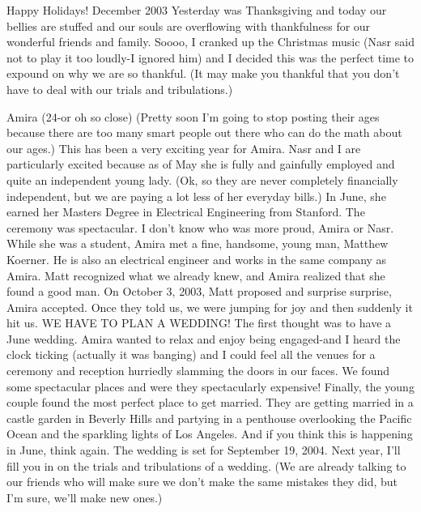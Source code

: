 

Happy Holidays!                                                  \hfill December 2003
\vspace{.5in}
Yesterday was Thanksgiving and today our bellies are stuffed and our souls are overflowing with thankfulness for our wonderful friends and
family.  Soooo, I cranked up the Christmas music (Nasr said not to play it too loudly-I ignored him) and I decided this was the perfect time to
expound on why we are so thankful.  (It may make you thankful that you don't have to deal with our trials and tribulations.)

Amira (24-or oh so close) (Pretty soon I'm going to stop posting their ages because there are too many smart people out there who can do the
math about our ages.)  This has been a very exciting year for Amira.  Nasr and I are particularly excited because as of May she is fully and
gainfully employed and quite an independent young lady.  (Ok, so they are never completely financially independent, but we are paying a lot less
of her everyday bills.)  In June, she earned her Masters Degree in Electrical Engineering from Stanford. The ceremony was spectacular.  I don't
know who was more proud, Amira or Nasr. While she was a student, Amira met a fine, handsome, young man, Matthew Koerner.  He is also an
electrical engineer and works in the same company as Amira.  Matt recognized what we already knew, and Amira realized that she found a good man.
On October 3, 2003, Matt proposed and surprise surprise, Amira accepted.  Once they told us, we were jumping for joy and then suddenly it hit
us.  WE HAVE TO PLAN A WEDDING!   The first thought was to have a June wedding.  Amira wanted to relax and enjoy being engaged-and I heard the
clock ticking  (actually it was banging) and I could feel all the venues for a ceremony and reception hurriedly slamming the doors in our faces.
We found some spectacular places and were they spectacularly expensive!  Finally, the young couple found the most perfect place to get married.
They are getting married in a castle garden in Beverly Hills and partying in a penthouse overlooking the Pacific Ocean and the sparkling lights
of Los Angeles.  And if you think this is happening in June, think again.  The wedding is set for September 19, 2004.  Next year, I'll fill you
in on the trials and tribulations of a wedding. (We are already talking to our friends who will make sure we don't make the same mistakes they
did, but I'm sure, we'll make new ones.)

